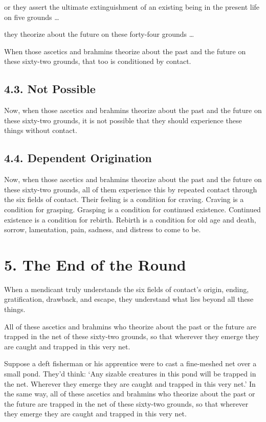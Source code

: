 \documentclass[12pt,openany]{book}%
\begin{document}
or they assert the ultimate extinguishment of an existing being in the present life on five grounds … 

they theorize about the future on these forty-four grounds … 

When those ascetics and brahmins theorize about the past and the future on these sixty-two grounds, that too is conditioned by contact. 

\subsection*{4.3. Not Possible }

Now, when those ascetics and brahmins theorize about the past and the future on these sixty-two grounds, it is not possible that they should experience these things without contact. 

\subsection*{4.4. Dependent Origination }

Now, when those ascetics and brahmins theorize about the past and the future on these sixty-two grounds, all of them experience this by repeated contact through the six fields of contact. Their feeling is a condition for craving. Craving is a condition for grasping. Grasping is a condition for continued existence. Continued existence is a condition for rebirth. Rebirth is a condition for old age and death, sorrow, lamentation, pain, sadness, and distress to come to be. 

\section*{5. The End of the Round }

When a mendicant truly understands the six fields of contact’s origin, ending, gratification, drawback, and escape, they understand what lies beyond all these things. 

All of these ascetics and brahmins who theorize about the past or the future are trapped in the net of these sixty-two grounds, so that wherever they emerge they are caught and trapped in this very net. 

Suppose a deft fisherman or his apprentice were to cast a fine-meshed net over a small pond. They’d think: ‘Any sizable creatures in this pond will be trapped in the net. Wherever they emerge they are caught and trapped in this very net.’ In the same way, all of these ascetics and brahmins who theorize about the past or the future are trapped in the net of these sixty-two grounds, so that wherever they emerge they are caught and trapped in this very net. 
\end{document}
